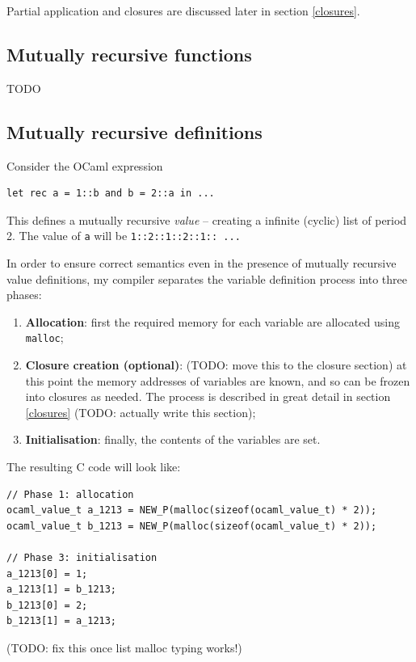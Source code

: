 \documentclass[12pt,a4paper,twoside,openright]{report}
\begin{document}
Partial application and closures are discussed later in section \ref{closures}.

\subsection{Mutually recursive functions}\label{mutually-recursive-functions}

TODO

\subsection{Mutually recursive definitions}\label{mutually-recursive-values}

Consider the OCaml expression

\begin{lstlisting}
let rec a = 1::b and b = 2::a in ...
\end{lstlisting}

This defines a mutually recursive \textit{value} -- creating a infinite
(cyclic) list of period 2. The value of \lstinline!a! will be
\lstinline!1::2::1::2::1:: ...!

In order to ensure correct semantics even in the presence of mutually recursive
value definitions, my compiler separates the variable definition process into
three phases:

\begin{enumerate}
  \item \textbf{Allocation}: first the required memory for each variable are
    allocated using \lstinline!malloc!;
  \item \textbf{Closure creation (optional)}: (TODO: move this to the closure section)  at this point the memory
    addresses of variables are known, and so can be frozen into closures as
    needed. The process is described in great detail in section \ref{closures}
    (TODO: actually write this section);
  \item \textbf{Initialisation}: finally, the contents of the variables are
    set.
\end{enumerate}

The resulting C code will look like:

\begin{lstlisting}
// Phase 1: allocation
ocaml_value_t a_1213 = NEW_P(malloc(sizeof(ocaml_value_t) * 2));
ocaml_value_t b_1213 = NEW_P(malloc(sizeof(ocaml_value_t) * 2));

// Phase 3: initialisation
a_1213[0] = 1;
a_1213[1] = b_1213;
b_1213[0] = 2;
b_1213[1] = a_1213;
\end{lstlisting}
(TODO: fix this once list malloc typing works!)
\end{document}
